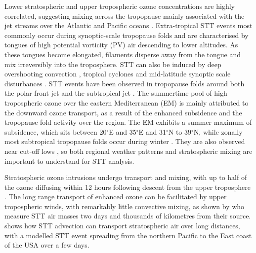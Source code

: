   Lower stratospheric and upper tropospheric ozone concentrations are highly correlated, suggesting mixing across the tropopause mainly associated with the jet streams over the Atlantic and Pacific oceans \parencite{Terao2008}.
  Extra-tropical STT events most commonly occur during synoptic-scale tropopause folds \parencite{Sprenger2003, Tang2012, Frey2015} and are characterised by tongues of high potential vorticity (PV) air descending to lower altitudes.
  As these tongues become elongated, filaments disperse away from the tongue and mix irreversibly into the troposphere.
  STT can also be induced by deep overshooting convection \parencite{Frey2015}, tropical cyclones \parencite{Das2016} and mid-latitude synoptic scale disturbances \parencite[e.g.][]{Stohl2003, Mihalikova2012}. 
  STT events have been observed in tropopause folds around both the polar front jet \parencite{Vaughan1994, Beekmann1997} and the subtropical jet \parencite{Baray2000}.
  The summertime pool of high tropospheric ozone over the eastern Mediterranean (EM) is mainly attributed to the downward ozone transport, as a result of the enhanced subsidence \parencite{Zanis2014} and the tropopause fold activity \parencite{Akritidis2016} over the region.
  The EM exhibits a summer maximum of subsidence, which sits between 20$^{\circ}$E and 35$^{\circ}$E and 31$^{\circ}$N to 39$^{\circ}$N, while zonally most subtropical tropopause folds occur during winter \parencite[][and references therein]{Tyrlis2014}.
  They are also observed near cut-off lows \parencite{Price1993, Wirth1995}, so both regional weather patterns and stratospheric mixing are important to understand for STT analysis.
  
  Stratospheric ozone intrusions undergo transport and mixing, with up to half of the ozone diffusing within 12 hours following descent from the upper troposphere \parencite{Trickl2014}.
  The long range transport of enhanced ozone can be facilitated by upper tropospheric winds, with remarkably little convective mixing, as shown by \textcite{Trickl2014} who measure STT air masses two days and thousands of kilometres from their source.
  \textcite{Cooper2004} shows how STT advection can transport stratospheric air over long distances, with a modelled STT event spreading from the northern Pacific to the East coast of the USA over a few days.
  
